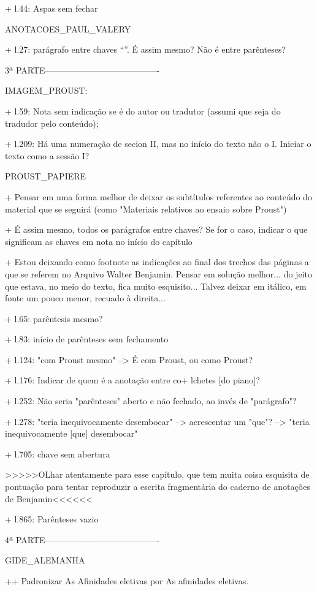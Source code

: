 + l.44: Aspas sem fechar


ANOTACOES_PAUL_VALERY

+ l.27: parágrafo entre chaves ``{}''. É assim mesmo? Não é entre parênteses?

3ª PARTE----------------------------------------

IMAGEM_PROUST:

+ l.59: Nota sem indicação se é do autor ou tradutor (assumi que seja do tradudor pelo conteúdo);

+ l.209: Há uma numeração de secion II, mas no início do texto não o I. Iniciar o texto como a sessão I?

PROUST_PAPIERE

+ Pensar em uma forma melhor de deixar os subtítulos referentes ao conteúdo do material que se seguirá (como "Materiais relativos ao ensaio sobre Proust")

+ É assim mesmo, todos os parágrafos entre chaves? Se for o caso, indicar o que significam as chaves em nota no início do capítulo

+ Estou deixando como footnote as indicações ao final dos trechos das páginas a que se referem no Arquivo Walter Benjamin. Pensar em solução melhor... do jeito que estava, no meio do texto, fica muito esquisito... Talvez deixar em itálico, em fonte um pouco menor, recuado à direita...

+ l.65: parêntesis mesmo?

+ l.83: início de parênteses sem fechamento

+ l.124: "com Proust mesmo" --> É com Proust, ou como Proust?

+ l.176: Indicar de quem é a anotação entre co+ lchetes [do piano]?

+ l.252: Não seria "parênteses" aberto e não fechado, ao invés de "parágrafo"?

+ l.278: "teria inequivocamente desembocar" --> acrescentar um "que"? --> "teria inequivocamente [que] desembocar"

+ l.705: chave sem abertura

>>>>>OLhar atentamente para esse capítulo, que tem muita coisa esquisita de pontuação para tentar reproduzir a escrita fragmentária do caderno de anotações de Benjamin<<<<<<

+ l.865: Parênteses vazio

4ª PARTE----------------------------------------

GIDE_ALEMANHA

++ Padronizar As Afinidades eletivas por As afinidades eletivas.

